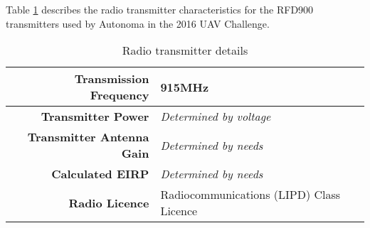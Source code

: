 Table \ref{tab:radio} describes the radio transmitter characteristics for the RFD900 transmitters used by Autonoma in the 2016 UAV Challenge.

\begin{table}[H]
	\centering
	\begin{tabular}{|r|l|}
		\hline
		\textbf{Transmission Frequency}   & 915MHz \\ \hline
		\textbf{Transmitter Power}        & \textit{Determined by voltage} \\ \hline
		\textbf{Transmitter Antenna Gain} & \textit{Determined by needs} \\ \hline
		\textbf{Calculated EIRP}          & \textit{Determined by needs} \\ \hline
		\textbf{Radio Licence}			  & Radiocommunications (LIPD) Class Licence \\ \hline
	\end{tabular}
	\caption{Radio transmitter details}
	\label{tab:radio}
\end{table}
